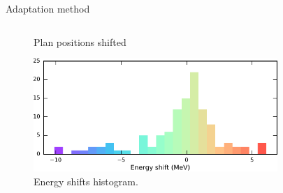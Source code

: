 \documentclass[pdf,dvipsnames,aspectratio=169]{beamer}
\begin{document}
\begin{frame}[c]{Adaptation method}
\begin{columns}[t]
\begin{column}{0.5\textwidth}
{\begin{figure}
                    \caption{Plan positions shifted}
                \end{figure}
                \vspace{-1.0cm}
                \begin{figure}
                    \includegraphics[width=\textwidth]{imgs/energy_shifts.pdf}
                    \caption{Energy shifts histogram.}
                \end{figure}
            }
        \end{column}
        \begin{column}{0.45\textwidth}
            \begin{figure}

\end{figure}
\end{column}
\end{columns}
\end{frame}
\end{document}
